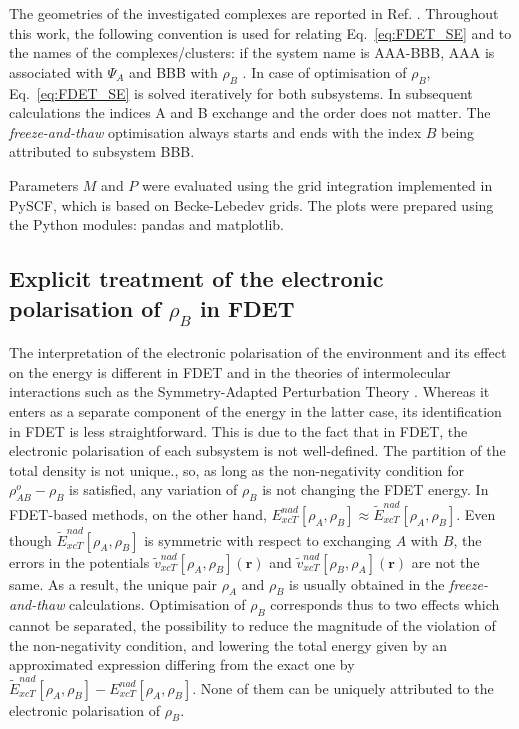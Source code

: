 \documentclass[amsmath,amssymb,preprint,aip,jcp]{revtex4-1}
\begin{document}
The geometries of the investigated complexes are reported in Ref. . 
Throughout this work, the following convention is used for relating Eq.~\ref{eq:FDET_SE} and to the names of the complexes/clusters: if the system name is AAA-BBB, AAA is associated with $\Psi_A$ and BBB with $\rho_B$ .
In case of optimisation of $\rho_B$, Eq.~\ref{eq:FDET_SE} is solved 
iteratively for both subsystems. In subsequent calculations the indices A and B exchange and the order does not matter.
The \textit{freeze-and-thaw} optimisation always starts and ends with the index $B$ being attributed to subsystem BBB. 
 
Parameters $M$ and $P$ were evaluated using the grid integration implemented in PySCF\cite{PYSCF}, which is based on Becke\cite{Becke1988b}-Lebedev\cite{Lebedev1999} grids. 
The plots were prepared using the Python modules: pandas\cite{PANDAS} and matplotlib\cite{Hunter2007}.
\subsection{Explicit treatment of the electronic polarisation of $\rho_B$ in FDET}\label{sect:pol_treat}
The interpretation of the electronic polarisation of the environment and its effect on the energy is different in FDET and in the theories of intermolecular interactions such as the Symmetry-Adapted Perturbation Theory \cite{Jeziorski1994}. Whereas it enters as a separate component of the energy in the latter case, its identification in FDET is less straightforward.
This is due to the fact that in FDET, the electronic polarisation of each subsystem is not well-defined.\cite{HumbertDroz2014} The partition of the total density is not unique.\cite{Savin2009}, so, as long as the non-negativity condition for $\rho^{o}_{AB}-\rho_B$ is satisfied, any variation of $\rho_B$ is not changing the FDET energy.
In FDET-based methods, on the other hand, ${E}_{xcT}^{nad}[\rho_A,\rho_B]\approx \tilde{E}_{xcT}^{nad}[\rho_A,\rho_B]$. 
Even though $\tilde{E}_{xcT}^{nad}[\rho_A,\rho_B]$
is symmetric with respect to exchanging $A$ with $B$, 
the errors in the potentials $\tilde{v}_{xcT}^{nad}[\rho_A,\rho_B](\mathbf{r})$ and $\tilde{v}_{xcT}^{nad}[\rho_B,\rho_A](\mathbf{r})$
 are not the same. 
As a result, the unique pair $\rho_A$ and $\rho_B$ is usually obtained in the \textit{freeze-and-thaw} calculations.\cite{Wesolowski2015,Wesolowski1997a,Dulak2007a} 
Optimisation of $\rho_B$ corresponds thus to two effects which cannot be separated, the possibility to reduce the magnitude of the violation of the non-negativity condition, and lowering the total energy given by an approximated expression differing from the exact one by $\tilde{E}_{xcT}^{nad}[\rho_A,\rho_B]-{E}_{xcT}^{nad}[\rho_A,\rho_B]$. None of them can be uniquely attributed to the electronic polarisation of $\rho_B$. 
\end{document}
